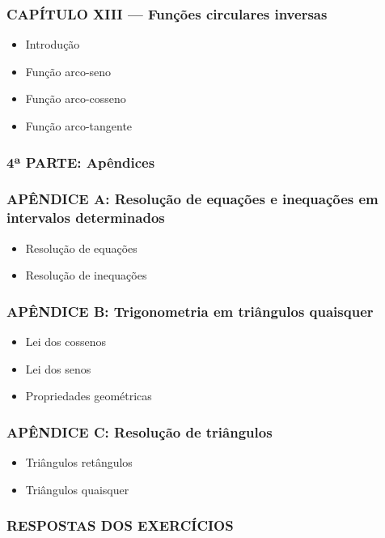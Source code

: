 \documentclass[a4paper,12pt]{article}[abntex2]
\begin{document}
\subsubsection*{CAPÍTULO XIII — Funções circulares inversas}

\begin{itemize}
\item Introdução
\item Função arco-seno
\item Função arco-cosseno
\item Função arco-tangente
\end{itemize}
\subsubsection*{4ª PARTE: Apêndices}

\subsubsection*{APÊNDICE A: Resolução de equações e inequações em intervalos determinados}

\begin{itemize}
\item Resolução de equações
\item Resolução de inequações
\end{itemize}
\subsubsection*{APÊNDICE B: Trigonometria em triângulos quaisquer}

\begin{itemize}
\item Lei dos cossenos
\item Lei dos senos
\item Propriedades geométricas
\end{itemize}
\subsubsection*{APÊNDICE C: Resolução de triângulos}

\begin{itemize}
\item Triângulos retângulos
\item Triângulos quaisquer
\end{itemize}
\subsubsection*{RESPOSTAS DOS EXERCÍCIOS}
\end{document}
